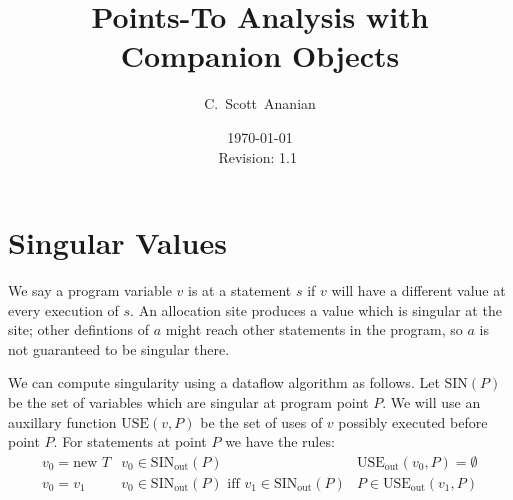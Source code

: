 \documentclass[11pt,notitlepage]{article}
\author{C.~Scott~Ananian}
\title{Points-To Analysis with Companion Objects}
\date{\today \\ $ $Revision: 1.1 $ $}
\begin{document}
%
\maketitle
\section{Singular Values}

We say a program variable $v$ is  at a statement $s$
if $v$ will have a different value at every execution of $s$.  An
allocation site  produces a value which is singular
at the site; other defintions of $a$ might reach other statements in
the program, so $a$ is not guaranteed to be singular there.

We can compute singularity using a dataflow algorithm as follows.
Let $\text{SIN}(P)$ be the set of variables which are singular
at program point $P$.  We will use an auxillary function
$\text{USE}(v, P)$ be the set of uses of $v$ possibly executed before
point $P$.  For statements at point $P$ we have the rules:
\begin{displaymath}
\begin{array}{lll}
v_0 = \text{new } T & v_0 \in \text{SIN}_{\text{out}}(P)
                    & \text{USE}_{\text{out}}(v_0, P) = \emptyset \\
v_0 = v_1 & v_0 \in \text{SIN}_{\text{out}}(P) \text{ iff }
            v_1 \in \text{SIN}_{\text{out}}(P)
          & P \in \text{USE}_{\text{out}}(v_1, P) \\

%
\end{array}
\end{displaymath}
\end{document}
